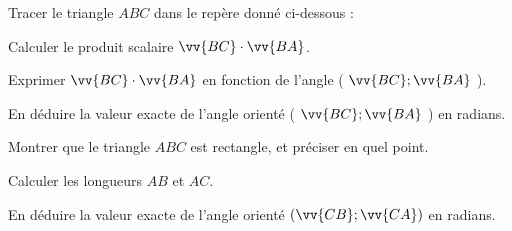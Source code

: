 \documentclass[12pt,a4paper]{article}  %
\begin{document}
\begin{enumMet}
	\item Tracer le triangle $A B C$ dans le repère donné ci-dessous :
	
	\begin{center}
	\end{center}
	\item Calculer le produit scalaire $\vv{B C} \cdot \vv{B A}$.
	\item \begin{enumMet}
		\item Exprimer $\vv{B C} \cdot \vv{B A}$ en fonction de l'angle ( $\vv{B C} ; \vv{B A}$ ).
		\item En déduire la valeur exacte de l'angle orienté ( $\vv{B C} ; \vv{B A}$ ) en radians.
	\end{enumMet}
	\item Montrer que le triangle $A B C$ est rectangle, et préciser en quel point.
	\item \begin{enumMet}
		\item Calculer les longueurs $A B$ et $A C$.
		\item En déduire la valeur exacte de l'angle orienté $(\vv{C B} ; \vv{C A})$ en radians.
	\end{enumMet}
\end{enumMet}
\end{document}
